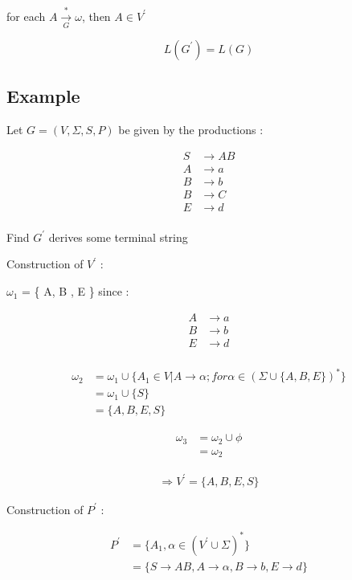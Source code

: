\documentclass[12pt]{book}
\begin{document}
for each $A \xrightarrow[G]{*} \omega$, then $A \in V^{\prime}$ 
  
$$
L(G^{\prime}) = L(G)
$$


\subsection{Example}

Let $G = (V, \Sigma, S, P)$ be given by the productions :

\begin{align*}
S &\to AB \\
A &\to a \\
B &\to b \\
B &\to C \\
E &\to d \\
\end{align*}

Find $G^{\prime}$ derives some terminal string

Construction of $V^{\prime}$ :

$\omega_{1}$ = \{ A, B , E \} since :

\begin{align*}
A &\to a \\
B &\to b \\
E &\to d \\
\end{align*}

\begin{align*}
\omega_{2} &= \omega_{1} \cup \{ A_{1} \in V | A \to \alpha ; for \alpha \in ( \Sigma \cup \{ A, B, E \} )^{*} \} \\
&= \omega_{1} \cup \{ S \} \\
&= \{ A, B, E, S \}
\end{align*}

\begin{align*}
\omega_{3} &= \omega_{2} \cup \phi \\
&= \omega_{2} 
\end{align*}

\begin{align*}
\Rightarrow V^{\prime} = \{ A, B, E, S \}
\end{align*}

Construction of $P^{\prime}$ :

\begin{align*}
P^{\prime} &= \{ A_{1}, \alpha \in (V^{\prime} \cup \Sigma)^{*} \} \\
&= \{ S \to AB, A \to \alpha , B \to b , E \to d \}
\end{align*}
\end{document}
